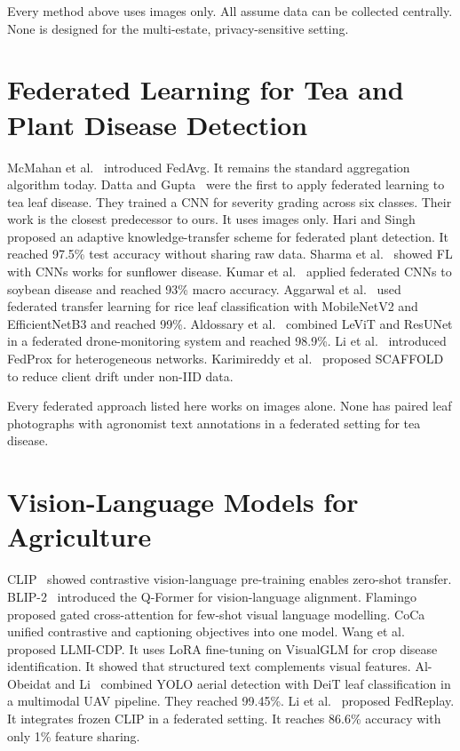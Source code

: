 \documentclass[12pt, a4paper, oneside]{Thesis}
\begin{document}
Every method above uses images only. All assume data can be collected centrally.
None is designed for the multi-estate, privacy-sensitive setting.

\section{Federated Learning for Tea and Plant Disease Detection}

McMahan et al.~\cite{McMahan2017} introduced FedAvg. It remains the standard
aggregation algorithm today. Datta and Gupta~\cite{DattaGupta2023} were the first to
apply federated learning to tea leaf disease. They trained a CNN for severity grading
across six classes. Their work is the closest predecessor to ours. It uses images only.
Hari and Singh~\cite{HariSingh2024} proposed an adaptive knowledge-transfer scheme
for federated plant detection. It reached 97.5\% test accuracy without sharing raw
data. Sharma et al.~\cite{Sharma2022} showed FL with CNNs works for sunflower disease.
Kumar et al.~\cite{Kumar2024} applied federated CNNs to soybean disease and reached
93\% macro accuracy. Aggarwal et al.~\cite{Aggarwal2023} used federated transfer
learning for rice leaf classification with MobileNetV2 and EfficientNetB3 and
reached 99\%. Aldossary et al.~\cite{Aldossary2025} combined LeViT and ResUNet in a
federated drone-monitoring system and reached 98.9\%. Li et al.~\cite{Li2020}
introduced FedProx for heterogeneous networks. Karimireddy et
al.~\cite{Karimireddy2020} proposed SCAFFOLD to reduce client drift under non-IID
data.

Every federated approach listed here works on images alone. None has paired leaf
photographs with agronomist text annotations in a federated setting for tea disease.

\section{Vision-Language Models for Agriculture}

CLIP~\cite{Radford2021} showed contrastive vision-language pre-training enables
zero-shot transfer. BLIP-2~\cite{Li2023} introduced the Q-Former for vision-language
alignment. Flamingo~\cite{Alayrac2022} proposed gated cross-attention for few-shot
visual language modelling. CoCa~\cite{Yu2022} unified contrastive and captioning
objectives into one model.
Wang et al.~\cite{Long2025} proposed LLMI-CDP. It uses LoRA fine-tuning on VisualGLM
for crop disease identification. It showed that structured text complements visual
features. Al-Obeidat and Li~\cite{AlObeidat2025} combined YOLO aerial detection with
DeiT leaf classification in a multimodal UAV pipeline. They reached 99.45\%.
Li et al.~\cite{Li2025} proposed FedReplay. It integrates frozen CLIP in a federated
setting. It reaches 86.6\% accuracy with only 1\% feature sharing.
\end{document}

